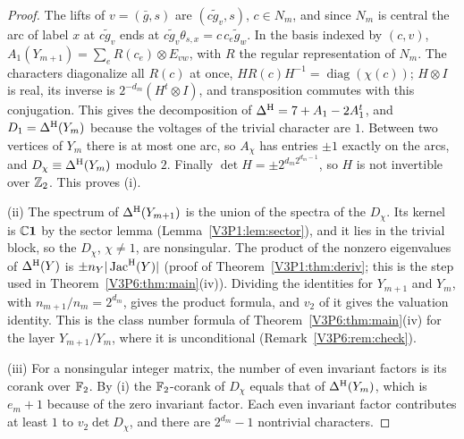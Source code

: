 \begin{proof}
The lifts of $v=(\bar g,s)$ are $(c\tilde g_v,s)$, $c\in N_m$, and since $N_m$ is central the
arc of label $x$ at $c\tilde g_v$ ends at $c\tilde g_v\theta_{s,x}=c\,c_e\tilde g_w$. In the basis
indexed by $(c,v)$, $A_1(Y_{m+1})=\sum_eR(c_e)\otimes E_{vw}$, with $R$ the regular
representation of $N_m$. The characters diagonalize all $R(c)$ at once,
$HR(c)H^{-1}=\operatorname{diag}(\chi(c))$; $H\otimes I$ is real, its inverse is
$2^{-d_m}(H^{t}\otimes I)$, and transposition commutes with this conjugation. This gives the
decomposition of $\Delta^{\mathrm{H}}=7+A_1-2A_1^{t}$, and $D_1=\Delta^{\mathrm{H}}(Y_m)$ because the voltages of the
trivial character are $1$. Between two vertices of $Y_m$ there is at most one arc, so $A_\chi$
has entries $\pm1$ exactly on the arcs, and $D_\chi\equiv\Delta^{\mathrm{H}}(Y_m)$ modulo $2$. Finally
$\det H=\pm2^{d_m2^{d_m-1}}$, so $H$ is not invertible over $\mathbb{Z}_2$. This proves (i).

(ii) The spectrum of $\Delta^{\mathrm{H}}(Y_{m+1})$ is the union of the spectra of the $D_\chi$. Its kernel
is $\mathbb{C}\mathbf 1$ by the sector lemma (Lemma~\ref{V3P1:lem:sector}), and it lies in the trivial
block, so the $D_\chi$, $\chi\ne1$, are nonsingular. The product of the nonzero eigenvalues of
$\Delta^{\mathrm{H}}(Y)$ is $\pm n_Y|\operatorname{Jac}^{\mathrm{H}}(Y)|$ (proof of Theorem~\ref{V3P1:thm:deriv}; this is the step
used in Theorem~\ref{V3P6:thm:main}(iv)). Dividing the identities for $Y_{m+1}$ and $Y_m$, with
$n_{m+1}/n_m=2^{d_m}$, gives the product formula, and $v_2$ of it gives the valuation identity.
This is the class number formula of Theorem~\ref{V3P6:thm:main}(iv) for the layer
$Y_{m+1}/Y_m$, where it is unconditional (Remark~\ref{V3P6:rem:check}).

(iii) For a nonsingular integer matrix, the number of even invariant factors is its corank over
$\mathbb{F}_2$. By (i) the $\mathbb{F}_2$-corank of $D_\chi$ equals that of $\Delta^{\mathrm{H}}(Y_m)$, which is $e_m+1$
because of the zero invariant factor. Each even invariant factor contributes at least $1$ to
$v_2\det D_\chi$, and there are $2^{d_m}-1$ nontrivial characters.


\end{proof}

